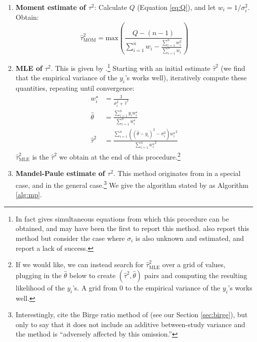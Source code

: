 \documentclass[letterpaper,12pt]{article}
\begin{document}
\begin{enumerate}
  \item \textbf{Moment estimate of $\tau^2$}: Calculate $Q$ (Equation \ref{eq:Q}), and let $w_i=1/\sigma_i^2$. Obtain:
  \begin{equation}
    \hat\tau^2_{\mathrm{MOM}}=\mathrm{max}\left(\frac{Q-(n-1)}{\sum_{i=1}^nw_i - \frac{\sum_{i=1}^nw_i^2}{\sum_{i=1}^nw_i}}\right)
  \end{equation}
  \item \textbf{MLE of $\tau^2$}. This is given by \citet[eq.~8-9]{hardy1996likelihood}.\footnote{In fact
  \citet[pg.~113]{cochran1937problems} gives simultaneous equations from which this procedure can be obtained, and may have been the first to report this method. \citet[Section 2.8]{rao1981estimators} also report this method but consider the case where $\sigma_i$ is also unknown and estimated, and report a lack of success.
  } Starting with an initial estimate $\hat\tau^2$ (we find that the empirical variance of the $y_i$'s works well), iteratively compute these quantities, repeating until convergence:
  \begin{align*}
  w_i^\star &= \frac{1}{\sigma_i^2+\hat\tau^2}\\
  \hat\theta &= \frac{\sum_{i=1}^n y_iw_i^\star}{\sum_{i=1}^n w_i^\star}\\
  \hat\tau^2 &= \frac{\sum_{i=1}^n ((\hat\theta-y_i)^2-\sigma_i^2){w_i^\star}^2}{\sum_{i=1}^n {w_i^\star}^2}
  \end{align*}
  $\hat\tau^2_{\mathrm{MLE}}$ is the $\hat\tau^2$ we obtain at the end of this procedure.\footnote{If we would like, we can instead search for $\hat\tau^2_{\mathrm{MLE}}$ over a grid of values, plugging in the $\hat\theta$ below to create $(\hat\tau^2,\hat\theta)$ pairs and computing the resulting likelihood of the $y_i$'s. A grid from $0$ to the empirical variance of the $y_i$'s works well.}
  \item \textbf{Mandel-Paule estimate of $\tau^2$}. This method originates from \citet{mandel1970interlaboratory} in a special case, and \citet{paule1982consensus} in the general case.\footnote{Interestingly, \citet[pg.~377]{paule1982consensus} cite the Birge ratio method of \citet{birge1932calculation} (see our Section \ref{sec:birge}), but only to say that it does not include an additive between-study variance and the method is ``adversely affected by this omission.''} We give the algorithm stated by \citet[Appendix A]{dersimonian2007random} as Algorithm \ref{alg:mp}.
  \begin{algorithm}[htbp]

\end{algorithm}
\end{enumerate}
\end{document}
